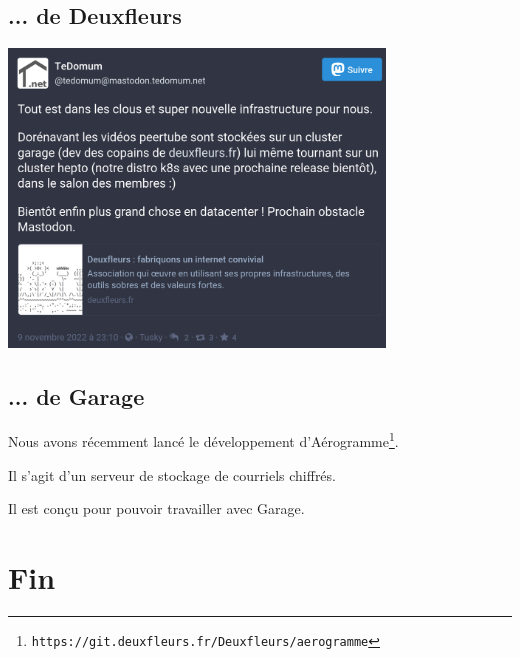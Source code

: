 \documentclass[11pt, aspectratio=1610]{beamer}
\begin{document}
\subsection{... de Deuxfleurs}
\begin{frame}
\begin{center}
\includegraphics[width=10cm]{tedomum.png}
\end{center}
\end{frame}

\subsection{... de Garage}
\begin{frame}
\begin{center}
Nous avons récemment lancé le développement d'Aérogramme\footnote[frame]{\texttt{https://git.deuxfleurs.fr/Deuxfleurs/aerogramme}}.\linebreak

\vspace{1cm}
Il s'agit d'un serveur de stockage de courriels chiffrés.\linebreak

\vspace{1cm}
Il est conçu pour pouvoir travailler avec Garage.
\end{center}
\end{frame}

\section{Fin}
\end{document}
